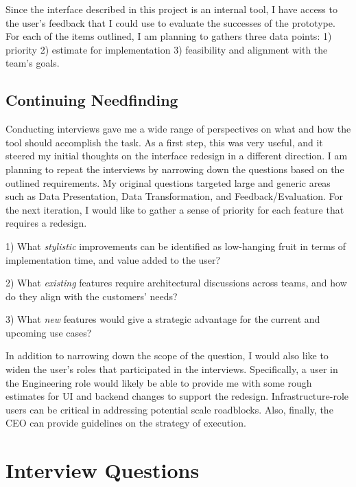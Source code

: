 \documentclass[12pt,letterpaper]{article}
\begin{document}
Since the interface described in this project is an internal tool, I have access to the user's feedback that I could use to evaluate the successes of the prototype. For each of the items outlined, I am planning to gathers three data points: 1) priority 2) estimate for implementation 3) feasibility and alignment with the team's goals.  


\subsection*{Continuing Needfinding}
Conducting interviews gave me a wide range of perspectives on what and how the tool should accomplish the task. As a first step, this was very useful, and it steered my initial thoughts on the interface redesign in a different direction. I am planning to repeat the interviews by narrowing down the questions based on the outlined requirements. My original questions targeted large and generic areas such as Data Presentation, Data Transformation, and Feedback/Evaluation. For the next iteration, I would like to gather a sense of priority for each feature that requires a redesign. 

1) What \textit{stylistic} improvements can be identified as low-hanging fruit in terms of implementation time, and value added to the user?

2) What \textit{existing} features require architectural discussions across teams, and how do they align with the customers' needs?

3) What \textit{new} features would give a strategic advantage for the current and upcoming use cases? 

In addition to narrowing down the scope of the question, I would also like to widen the user's roles that participated in the interviews. Specifically, a user in the Engineering role would likely be able to provide me with some rough estimates for UI and backend changes to support the redesign. Infrastructure-role users can be critical in addressing potential scale roadblocks. Also, finally, the CEO can provide guidelines on the strategy of execution. 

 


\newpage

\appendix

\section{Interview Questions}
\end{document}
